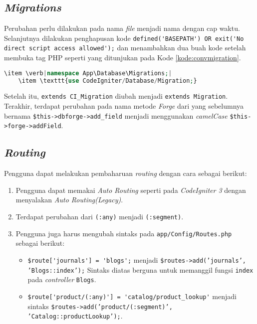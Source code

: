 \subsection{\textit{Migrations}}

Perubahan perlu dilakukan pada nama \textit{file} menjadi nama dengan cap waktu. Selanjutnya dilakukan penghapusan kode \verb|defined('BASEPATH') OR exit('No direct script access allowed');| dan menambahkan dua buah kode setelah membuka tag PHP seperti yang ditunjukan pada Kode \ref{kode:convmigration}.
\begin{lstlisting}[language=PHP, caption=Penambahan kode pada \textit{file migration}. ,label=kode:convmigration]
\item \verb|namespace App\Database\Migrations;|
	\item \texttt{use CodeIgniter/Database/Migration;}
\end{lstlisting}
Setelah itu, \verb|extends CI_Migration| diubah menjadi \verb|extends Migration|. Terakhir, terdapat perubahan pada nama metode \textit{Forge} dari yang sebelumnya bernama \verb|$this->dbforge->add_field| menjadi menggunakan \textit{camelCase} \verb|$this->forge->addField|.

\subsection{\textit{Routing}}

Pengguna dapat melakukan pembaharuan \textit{routing} dengan cara sebagai berikut:
\begin{enumerate}
\item Pengguna dapat memakai \textit{Auto Routing} seperti pada \textit{CodeIgniter 3} dengan menyalakan \textit{Auto Routing(Legacy)}.
\item Terdapat perubahan dari \verb|(:any)| menjadi \verb|(:segment)|.
\item Pengguna juga harus mengubah sintaks pada \verb|app/Config/Routes.php| sebagai berikut:
	\begin{itemize}
	\item \verb|$route['journals'] = 'blogs';| menjadi \texttt{\$routes->add('journals', 'Blogs::index');} 
	Sintaks diatas berguna untuk memanggil fungsi \texttt{index} pada \textit{controller} \texttt{Blogs}.
	\item \verb|$route['product/(:any)'] = 'catalog/product_lookup'| menjadi sintaks 		\texttt{\$routes->add('product/(:segment)', 'Catalog::productLookup');}.
	\end{itemize}
\end{enumerate}

